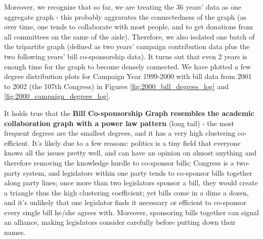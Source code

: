 \documentclass[12pt,twocolumn]{article}
\begin{document}
Moreover, we recognize that so far, we are treating the 36 years' data as one aggregate graph - this probably aggravates the connectedness of the graph (as over time, one tends to collaborate with most people, and to get donations from all committees on the same of the aisle). Therefore, we also isolated one batch of the tripartite graph (defined as two years' campaign contribution data plus the two following years' bill co-sponsorship data). It turns out that even 2 years is enough time for the graph to become densely connected. We have plotted a few degree distribution plots for Campaign Year 1999-2000 with bill data from 2001 to 2002 (the 107th Congress) in Figures \ref{fig:2000_bill_degrees_log} and \ref{fig:2000_campaign_degrees_log}. 

It holds true that the \textbf{Bill Co-sponsorship Graph resembles the academic collaboration graph with a power law pattern} (long tail) - the most frequent degrees are the smallest degrees, and it has a very high clustering co-efficient. It's likely due to a few reasons: politics is a tiny field that everyone knows all the issues pretty well, and can have an opinion on almost anything and therefore removing the knowledge hurdle to co-sponsor bills; Congress is a two-party system, and legislators within one party tends to co-sponsor bills together along party lines; once more than two legislators sponsor a bill, they would create a triangle thus the high clustering coefficient; yet bills come in a dime a dozen, and it's unlikely that one legislator finds it necessary or efficient to co-sponsor every single bill he/she agrees with. Moreover, sponsoring bills together can signal an alliance, making legislators consider carefully before putting down their names. 
\end{document}
